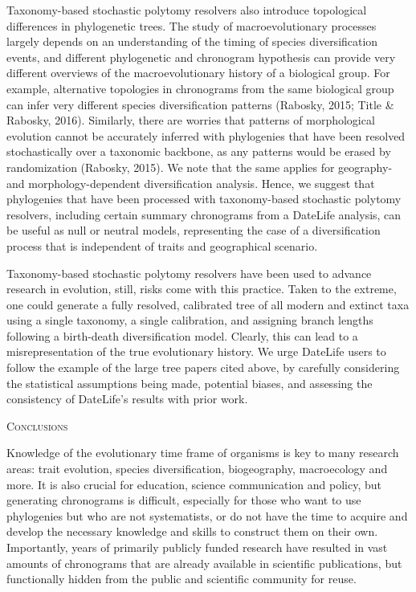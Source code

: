 \documentclass[english,man]{apa6}
\begin{document}
Taxonomy-based stochastic polytomy resolvers also introduce topological differences in phylogenetic trees.
The study of macroevolutionary processes largely depends on an understanding of the timing of species diversification events, and different phylogenetic and chronogram hypothesis can provide very different overviews of the macroevolutionary history of a biological group.
For example, alternative topologies in chronograms from the same biological group can infer very different species diversification patterns (Rabosky, 2015; Title \& Rabosky, 2016).
Similarly, there are worries that patterns of morphological evolution cannot be accurately inferred with phylogenies that have been resolved stochastically over a taxonomic backbone, as any patterns would be erased by randomization (Rabosky, 2015). We note that the same applies for geography- and morphology-dependent diversification analysis. Hence, we suggest that phylogenies that have been processed with taxonomy-based stochastic polytomy resolvers, including certain summary chronograms from a DateLife analysis, can be useful as null or neutral models, representing the case of a diversification process that is independent of traits and geographical scenario.

Taxonomy-based stochastic polytomy resolvers have been used to advance research in evolution, still, risks come with this practice.
Taken to the extreme, one could generate a fully resolved, calibrated tree of all modern and extinct taxa using a single taxonomy, a single calibration, and assigning branch lengths following a birth-death diversification model. Clearly, this can lead to a misrepresentation of the true evolutionary history.
We urge DateLife users to follow the example of the large tree papers cited above, by carefully considering the statistical assumptions being made, potential biases, and assessing the consistency of DateLife's results with prior work.

\begin{center}
\textsc{Conclusions}
\end{center}

Knowledge of the evolutionary time frame of organisms is key to many research areas: trait evolution, species diversification, biogeography, macroecology and more. It is also crucial for education, science communication and policy, but generating chronograms is difficult, especially for those who want to use phylogenies but who are not systematists, or do not have the time to acquire and develop the necessary knowledge and skills to construct them on their own. Importantly, years of primarily publicly funded research have resulted in vast amounts of chronograms that are already available in scientific publications, but functionally hidden from the public and scientific community for reuse.
\end{document}

